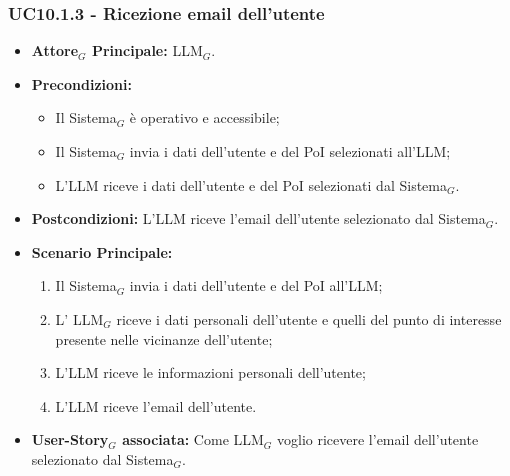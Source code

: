 \documentclass[10pt]{article}
\begin{document}
\begin{justify}
\subsubsection{\textbf{UC10.1.3 - Ricezione email dell'utente}}
\begin{itemize}
    \item \textbf{Attore$_G$ Principale:} LLM$_G$.
    \item \textbf{Precondizioni:} 
        \begin{itemize}
          \item Il Sistema$_G$ è operativo e accessibile;
          \item Il Sistema$_G$ invia i dati dell'utente e del PoI selezionati all'LLM;
            \item L'LLM riceve i dati dell'utente e del PoI selezionati dal Sistema$_G$.
        \end{itemize}
      \item \textbf{Postcondizioni:} L'LLM riceve l'email dell'utente selezionato dal Sistema$_G$.
    \item \textbf{Scenario Principale:} 
        \begin{enumerate}
          \item Il Sistema$_G$ invia i dati dell'utente e del PoI all'LLM;
        \item L' LLM$_G$ riceve i dati personali dell'utente e quelli del punto di interesse presente nelle vicinanze dell'utente;
          \item L'LLM riceve le informazioni personali dell'utente;
          \item L'LLM riceve l'email dell'utente.
        \end{enumerate}
      \item \textbf{User-Story$_G$ associata:} Come LLM$_G$ voglio ricevere l'email dell'utente selezionato dal Sistema$_G$.
\end{itemize}

\end{justify}
\end{document}
